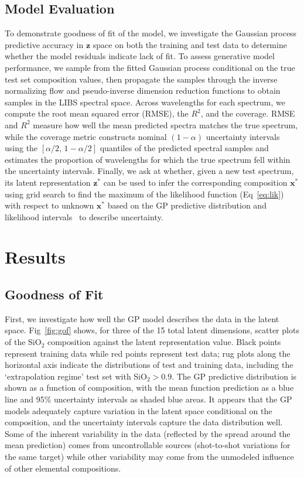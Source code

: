 \documentclass[letterpaper]{article} %
\begin{document}
\subsection{Model Evaluation}
To demonstrate goodness of fit of the model, we investigate the Gaussian process predictive accuracy in $\mathbf{z}$ space on both the training and test data to determine whether the model residuals indicate lack of fit.
To assess generative model performance, we sample from the fitted Gaussian process conditional on the true test set composition values, then propagate the samples through the inverse normalizing flow and pseudo-inverse dimension reduction functions to obtain samples in the LIBS spectral space.
Across wavelengths for each spectrum, we compute the root mean squared error (RMSE), the $R^2$, and the coverage.
RMSE and $R^2$ measure how well the mean predicted spectra matches the true spectrum, while the coverage metric constructs nominal $(1-\alpha)$ uncertainty intervals using the $[\alpha/2, \, 1-\alpha/2]$ quantiles of the predicted spectral samples and estimates the proportion of wavelengths for which the true spectrum fell within the uncertainty intervals.
Finally, we ask at whether, given a new test spectrum, its latent representation $\mathbf{z}^*$ can be used to infer the corresponding composition $\mathbf{x}^*$
using grid search to find the maximum of the likelihood function (Eq~\ref{eq:lik}) with respect to unknown $\mathbf{x}^*$ based on the GP predictive distribution and likelihood intervals~\cite{owen1988empirical} to describe uncertainty.

\section{Results}

\subsection{Goodness of Fit}
First, we investigate how well the GP model describes the data in the latent space.
Fig~\ref{fig:gof} shows, for three of the 15 total latent dimensions, scatter plots of the SiO$_2$ composition against the latent representation value.
Black points represent training data while red points represent test data; rug plots along the horizontal axis indicate the distributions of test and training data, including the `extrapolation regime' test set with SiO$_2 > 0.9$.
The GP predictive distribution is shown as a function of composition, with the mean function prediction as a blue line and 95\% uncertainty intervals as shaded blue areas.
It appears that the GP models adequately capture variation in the latent space conditional on the composition, and the uncertainty intervals capture the data distribution well.
Some of the inherent variability in the data (reflected by the spread around the mean prediction) comes from uncontrollable sources (shot-to-shot variations for the same target) while other variability may come from the unmodeled influence of other elemental compositions.
\end{document}
